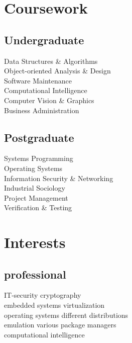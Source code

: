 \documentclass[]{resume}
\begin{document}
\vfill
\begin{minipage}[t]{0.33\textwidth} 
\section{Coursework}
	\subsection{Undergraduate}
		Data Structures \& Algorithms \\
		Object-oriented Analysis \& Design \\
		Software Maintenance \\
		Computational Intelligence\\
		Computer Vision \& Graphics \\
		Business Administration
		\sectionsep
	
	\subsection{Postgraduate}
		Systems Programming \\
		Operating Systems \\
		Information Security \& Networking \\
		Industrial Sociology \\
		Project Management \\ 
		Verification \& Testing
		\sectionsep	

\section{Interests} 
	\subsection{professional}
	IT-security \textbullet{} cryptography\\
	embedded systems \textbullet{} virtualization\\
	operating systems \textbullet{} different distributions\\
	emulation \textbullet{} various package managers\\
	computational intelligence
	\sectionsep


\end{minipage}
\end{document}
